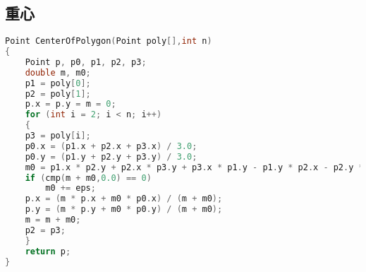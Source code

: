 \subsection{重心}
	\begin{lstlisting}[language=c++]
Point CenterOfPolygon(Point poly[],int n)
{
	Point p, p0, p1, p2, p3;
	double m, m0;
	p1 = poly[0];
	p2 = poly[1];
	p.x = p.y = m = 0;
	for (int i = 2; i < n; i++)
	{
	p3 = poly[i];
	p0.x = (p1.x + p2.x + p3.x) / 3.0;
	p0.y = (p1.y + p2.y + p3.y) / 3.0;
	m0 = p1.x * p2.y + p2.x * p3.y + p3.x * p1.y - p1.y * p2.x - p2.y * p3.x - p3.y * p1.x;
	if (cmp(m + m0,0.0) == 0)
		m0 += eps;
	p.x = (m * p.x + m0 * p0.x) / (m + m0);
	p.y = (m * p.y + m0 * p0.y) / (m + m0);
	m = m + m0;
	p2 = p3;
	}
	return p;
}
	\end{lstlisting}
